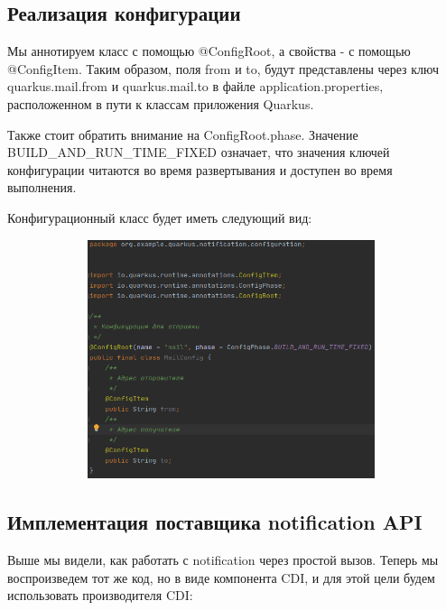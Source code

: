 \documentclass[russian,11pt]{article}
\begin{document}
\subsection{Реализация конфигурации}

Мы аннотируем класс с помощью @ConfigRoot, а свойства - с помощью @ConfigItem. Таким образом, поля from и to, будут представлены через ключ quarkus.mail.from и quarkus.mail.to в файле application.properties, расположенном в пути к классам приложения Quarkus.

	Также стоит обратить внимание на ConfigRoot.phase. Значение  BUILD\_AND\_RUN\_TIME\_FIXED означает, что значения ключей конфигурации читаются во время развертывания и доступен во время выполнения.
	
Конфигурационный класс будет иметь следующий вид:

\begin{figure}[H]
	\centering
	\includegraphics[scale=0.5, width=11cm, height=7cm]{6}
\end{figure}

\subsection{Имплементация поставщика notification API}

Выше мы видели, как работать с notification через простой вызов. Теперь мы воспроизведем тот же код, но в виде компонента CDI, и для этой цели будем использовать производителя CDI:
\end{document}

